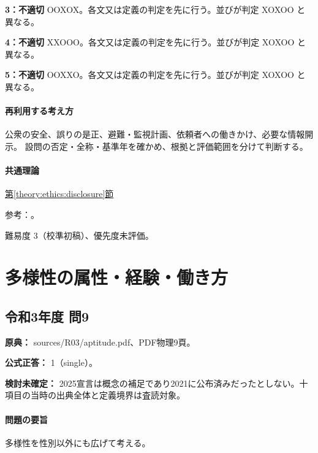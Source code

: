 \noindent\textbf{3：不適切} OOXOX。各文又は定義の判定を先に行う。並びが判定 XOXOO と異なる。\par

\noindent\textbf{4：不適切} XXOOO。各文又は定義の判定を先に行う。並びが判定 XOXOO と異なる。\par

\noindent\textbf{5：不適切} OOXXO。各文又は定義の判定を先に行う。並びが判定 XOXOO と異なる。\par

\paragraph{再利用する考え方} 公衆の安全、誤りの是正、避難・監視計画、依頼者への働きかけ、必要な情報開示。 設問の否定・全称・基準年を確かめ、根拠と評価範囲を分けて判断する。

\paragraph{共通理論} \hyperref[theory:ethics:disclosure]{第\ref*{theory:ethics:disclosure}節}

\par 参考：\cite{ipej_ethics2011,scu_ethics_framework}。

\par 難易度 3（校準初稿）、優先度未評価。

\section{多様性の属性・経験・働き方}

\subsection{令和3年度 問9}
\label{q:r03-reg-apt-09}

\noindent\textbf{原典：} sources/R03/aptitude.pdf、PDF物理9頁。

\textbf{公式正答：} 1（single）。

\par\textbf{検討未確定：} 2025宣言は概念の補足であり2021に公布済みだったとしない。十項目の当時の出典全体と定義境界は査読対象。

\paragraph{問題の要旨} 多様性を性別以外にも広げて考える。

